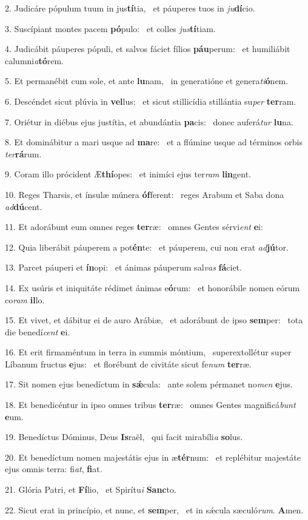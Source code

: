 2. Judicáre pópulum tuum in jus\textbf{tí}tia, \ast\  et páuperes tuos in \textit{ju}\textbf{dí}cio.\

3. Suscípiant montes pacem \textbf{pó}pulo: \ast\  et colles \textit{jus}\textbf{tí}tiam.\

4. Judicábit páuperes pópuli, et salvos fáciet fílios \textbf{páu}perum: \ast\  et humiliábit calumni\textit{a}\textbf{tó}rem.\

5. Et permanébit cum sole, et ante \textbf{lu}nam, \ast\  in generatióne et genera\textit{ti}\textbf{ó}nem.\

6. Descéndet sicut plúvia in \textbf{vel}lus: \ast\  et sicut stillicídia stillántia su\textit{per} \textbf{ter}ram.\

7. Oriétur in diébus ejus justítia, et abundántia \textbf{pa}cis: \ast\  donec auferá\textit{tur} \textbf{lu}na.\

8. Et dominábitur a mari usque ad \textbf{ma}re: \ast\  et a flúmine usque ad términos orbis \textit{ter}\textbf{rá}rum.\

9. Coram illo prócident Æ\textbf{thí}opes: \ast\  et inimíci ejus ter\textit{ram} \textbf{lin}gent.\

10. Reges Tharsis, et ínsulæ múnera \textbf{óf}ferent: \ast\  reges Arabum et Saba dona \textit{ad}\textbf{dú}cent.\

11. Et adorábunt eum omnes reges \textbf{ter}ræ: \ast\  omnes Gentes sérvi\textit{ent} \textbf{e}i:\

12. Quia liberábit páuperem a pot\textbf{én}te: \ast\  et páuperem, cui non erat \textit{ad}\textbf{jú}tor.\

13. Parcet páuperi et \textbf{ín}opi: \ast\  et ánimas páuperum sal\textit{vas} \textbf{fá}ciet.\

14. Ex usúris et iniquitáte rédimet ánimas e\textbf{ó}rum: \ast\  et honorábile nomen eórum co\textit{ram} \textbf{il}lo.\

15. Et vivet, et dábitur ei de auro Arábiæ, \dag\  et adorábunt de ipso \textbf{sem}per: \ast\  tota die benedí\textit{cent} \textbf{e}i.\

16. Et erit firmaméntum in terra in summis móntium, \dag\  superextollétur super Líbanum fructus \textbf{e}jus: \ast\  et florébunt de civitáte sicut fe\textit{num} \textbf{ter}ræ.\

17. Sit nomen ejus benedíctum in \textbf{sǽ}cula: \ast\  ante solem pérmanet no\textit{men} \textbf{e}jus.\

18. Et benedicéntur in ipso omnes tribus \textbf{ter}ræ: \ast\  omnes Gentes magnificá\textit{bunt} \textbf{e}um.\

19. Benedíctus Dóminus, Deus \textbf{Is}raël, \ast\  qui facit mirabíli\textit{a} \textbf{so}lus.\

20. Et benedíctum nomen majestátis ejus in æ\textbf{tér}num: \ast\  et replébitur majestáte ejus omnis terra: fi\textit{at}, \textbf{fi}at.\

21. Glória Patri, et \textbf{Fí}lio, \ast\  et Spirítu\textit{i} \textbf{Sanc}to.\

22. Sicut erat in princípio, et nunc, et \textbf{sem}per, \ast\  et in sǽcula sæculó\textit{rum}. \textbf{A}men.\

